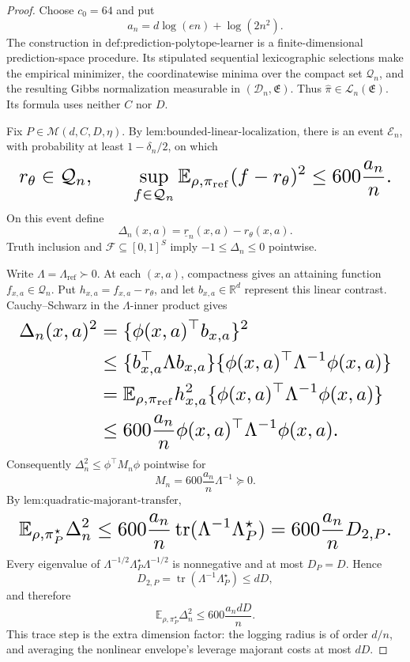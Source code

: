 \documentclass{article}
\begin{document}
\begin{proof}
Choose \(c_0=64\) and put
\[
a_n=d\log(en)+\log(2n^2).
\]
The construction in \(\text{def:prediction-polytope-learner}\) is a finite-dimensional prediction-space procedure. Its stipulated sequential lexicographic selections make the empirical minimizer, the coordinatewise minima over the compact set \(\mathcal Q_n\), and the resulting Gibbs normalization measurable in \((\mathcal D_n,\mathfrak E)\). Thus \(\widehat\pi\in\mathcal L_n(\mathfrak E)\). Its formula uses neither \(C\) nor \(D\).

Fix \(P\in\mathcal M(d,C,D,\eta)\). By \(\text{lem:bounded-linear-localization}\), there is an event \(\mathcal E_n\), with probability at least \(1-\delta_n/2\), on which
\[
\makebox[\linewidth][c]{\resizebox{0.98\linewidth}{!}{\(\displaystyle r_\theta\in\mathcal Q_n,
\qquad
\sup_{f\in\mathcal Q_n}\mathbb E_{\rho,\pi_{\mathrm{ref}}}(f-r_\theta)^2
\le600\frac{a_n}{n}.\)}}
\]
On this event define
\[
\Delta_n(x,a)=\underline r_n(x,a)-r_\theta(x,a).
\]
Truth inclusion and \(\mathcal F\subseteq[0,1]^S\) imply \(-1\le\Delta_n\le0\) pointwise.

Write \(\Lambda=\Lambda_{\mathrm{ref}}\succ0\). At each \((x,a)\), compactness gives an attaining function \(f_{x,a}\in\mathcal Q_n\). Put \(h_{x,a}=f_{x,a}-r_\theta\), and let \(b_{x,a}\in\mathbb R^d\) represent this linear contrast. Cauchy--Schwarz in the \(\Lambda\)-inner product gives
\[
\makebox[\linewidth][c]{\resizebox{0.98\linewidth}{!}{\(\displaystyle \begin{aligned}
\Delta_n(x,a)^2
&=\{\phi(x,a)^\top b_{x,a}\}^2\\
&\le\{b_{x,a}^\top\Lambda b_{x,a}\}
   \{\phi(x,a)^\top\Lambda^{-1}\phi(x,a)\}\\
&=\mathbb E_{\rho,\pi_{\mathrm{ref}}}h_{x,a}^2
   \{\phi(x,a)^\top\Lambda^{-1}\phi(x,a)\}\\
&\le600\frac{a_n}{n}\phi(x,a)^\top\Lambda^{-1}\phi(x,a).
\end{aligned}\)}}
\]
Consequently \(\Delta_n^2\le\phi^\top M_n\phi\) pointwise for
\[
M_n=600\frac{a_n}{n}\Lambda^{-1}\succeq0.
\]
By \(\text{lem:quadratic-majorant-transfer}\),
\[
\makebox[\linewidth][c]{\resizebox{0.98\linewidth}{!}{\(\displaystyle \mathbb E_{\rho,\pi_P^\star}\Delta_n^2
\le600\frac{a_n}{n}\operatorname{tr}(\Lambda^{-1}\Lambda_P^\star)
=600\frac{a_n}{n}D_{2,P}.\)}}
\]
Every eigenvalue of \(\Lambda^{-1/2}\Lambda_P^\star\Lambda^{-1/2}\) is nonnegative and at most \(D_P=D\). Hence
\[
D_{2,P}=\operatorname{tr}(\Lambda^{-1}\Lambda_P^\star)\le dD,
\]
and therefore
\[
\mathbb E_{\rho,\pi_P^\star}\Delta_n^2
\le600\frac{a_ndD}{n}.
\]
This trace step is the extra dimension factor: the logging radius is of order \(d/n\), and averaging the nonlinear envelope's leverage majorant costs at most \(dD\).


\end{proof}
\end{document}
